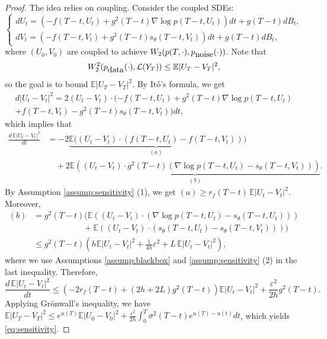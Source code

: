 \documentclass[letterpaper,11pt,reqno]{amsart}
\numberwithin{equation}{section}
\begin{document}
\begin{proof}
The idea relies on coupling.
Consider the coupled SDEs:
\begin{equation*}
\left\{ \begin{array}{lcl}
d U_t = \left(-f(T-t, U_t) + g^2(T-t) \nabla \log p(T-t, U_t) \right) dt+ g(T-t) dB_t, \\
d V_t =  \left(-f(T-t, V_t) + g^2(T-t)s_\theta(T-t, V_t) \right) dt+ g(T-t) dB_t,
\end{array}\right.
\end{equation*}
where $(U_0, V_0)$ are coupled to achieve $W_2(p(T,\cdot), p_{\tiny \mbox{noise}}(\cdot))$.
Note that
$$W_2^2(p_{\tiny \mbox{data}}(\cdot), \mathcal{L}(Y_T)) \le \mathbb{E}|U_T - V_T|^2,$$
so the goal is to bound $\mathbb{E}|U_T - V_T|^2$. 
By It\^o's formula, we get
\begin{multline*}
d|U_t - V_t|^2 = 2(U_t - V_t) \cdot (-f(T-t, U_t) + g^2(T-t) \nabla \log p(T-t, U_t) \\ + f(T-t, V_t) - g^2(T-t)s_\theta(T-t, V_t)) dt,
\end{multline*}
which implies that 
\begin{equation}
\label{eq:diff}
\begin{aligned}
\frac{d \, \mathbb{E}|U_t - V_t|^2}{dt} 
&= -2 \underbrace{\mathbb{E}((U_t - V_t) \cdot (f(T-t, U_t) - f(T-t, V_t))}_{(a)}) \\
&\quad+ 2 \underbrace{\mathbb{E}((U_t - V_t) \cdot g^2(T-t) (\nabla \log p(T-t, U_t) - s_\theta(T-t, V_t)))}_{(b)}.
\end{aligned}
\end{equation}
By Assumption \ref{assump:sensitivity} (1), we get
$(a) \ge r_f(T-t) \, \mathbb{E}|U_t - V_t|^2$.
Moreover,
\begin{equation}
\label{eq:termb}
\begin{aligned}
(b) & = g^2(T-t) \bigg( \mathbb{E}((U_t - V_t) \cdot (\nabla \log p(T-t, U_t) - s_\theta(T-t, U_t)  )) \\
& \qquad \qquad \qquad   + \mathbb{E}((U_t - V_t) \cdot (s_\theta (T-t, U_t) - s_{\theta}(T-t, V_t))) \bigg)\\
&  \le  g^2(T-t) \left( h \mathbb{E}|U_t - V_t|^2 + \frac{1}{4h} \varepsilon^2 + L\, \mathbb{E}|U_t - V_t|^2\right), 
\end{aligned}
\end{equation}
where we use Assumptions \ref{assump:blackbox} and \ref{assump:sensitivity} (2) in the last inequality.
Therefore,
\begin{equation*}
\frac{d \, \mathbb{E}|U_t - V_t|^2}{dt} \le \left(-2 r_f(T-t) + (2h + 2L) g^2(T-t) \right) \mathbb{E}|U_t -V_t|^2
+ \frac{\varepsilon^2}{2h} g^2(T-t).
\end{equation*}
Applying Gr\"onwall's inequality, we have
$\mathbb{E}|U_T - V_T|^2\leq e^{u(T)}\mathbb{E}|U_0 - V_0|^2+ \frac{\varepsilon^2}{2h} \int_0^T \sigma^2(T-t) e^{u(T)-u(t)} dt$,
which yields \eqref{eq:sensitivity}. 
\end{proof}
\end{document}
